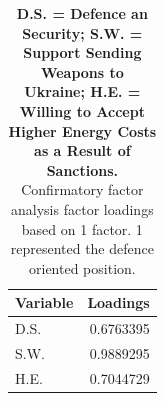 \begin{table}[H]

\caption{\textbf{D.S. = Defence an Security; S.W. = Support Sending Weapons to Ukraine; H.E. = Willing to Accept Higher Energy Costs as a Result of Sanctions.} Confirmatory factor analysis factor loadings based on 1 factor. 1 represented the defence oriented position. \label{tab:factor_loadings}}
\centering
\begin{tabular}[t]{lr}
\toprule
Variable & Loadings\\
\midrule
D.S. & 0.6763395\\
S.W. & 0.9889295\\
H.E. & 0.7044729\\
\bottomrule
\end{tabular}
\end{table}
